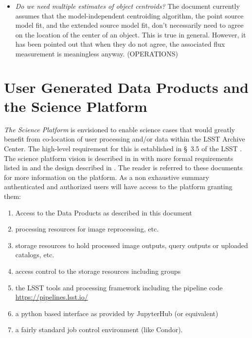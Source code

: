 \begin{openissues}
\begin{itemize}
    \item \emph{Do we need multiple estimates of object centroids?} The document currently assumes that the model-independent centroiding algorithm, the point source model fit, and the extended source model fit, don't necessarily need to agree on the location of the center of an object. This is true in general. However, it has been pointed out that when they do not agree, the associated flux measurement is meaningless anyway. (OPERATIONS)

\end{itemize}
\end{openissues}

\clearpage

\section{User Generated Data Products and the Science Platform}
\label{sec:level3}

\emph{The Science Platform} is  envisioned to enable science cases that would greatly benefit from co-location of user processing and/or data within the LSST Archive Center. The high-level requirement for this is established in \S~3.5 of the LSST \SRD.
The science platform vision is described in in 
with more formal requirements listed in  and the design described in .
The reader is referred to these documents for more information on the platform. As a non exhaustive summary
authenticated and authorized users will have access to the platform granting them:
\begin{enumerate}
    \item Access to the Data Products  as described in this document
    \item processing resources for image reprocessing, etc.
    \item storage resources to hold processed image outputs, query outputs or uploaded catalogs, etc.
    \item access control to the storage resources including groups  
    \item the LSST tools and processing  framework including the pipeline code \url{https://pipelines.lsst.io/}
    \item a python based interface as provided by JupyterHub (or equivalent)
     \item a fairly standard job control environment (like Condor).
\end{enumerate}

